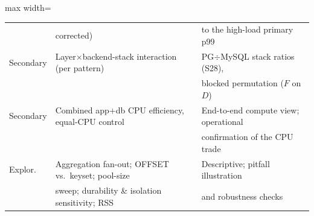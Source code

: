 \begin{table}[htbp]
\begin{adjustbox}{max width=\textwidth}
\begin{tabular}{l l l}
              & corrected)                                              & to the high-load primary p99       \\
    Secondary & Layer$\times$backend-stack interaction (per pattern)           & PG$\div$MySQL stack ratios (S28),  \\
              &                                                         & blocked permutation ($F$ on $D$)   \\
    Secondary & Combined app$+$db CPU efficiency, equal-CPU control     & End-to-end compute view; operational \\
              &                                                         & confirmation of the CPU trade      \\
    \midrule
    Explor.   & Aggregation fan-out; OFFSET vs.\ keyset; pool-size      & Descriptive; pitfall illustration  \\
              & sweep; durability \& isolation sensitivity; RSS         & and robustness checks              \\
    \bottomrule
  \end{tabular}
  \end{adjustbox}
\end{table}
